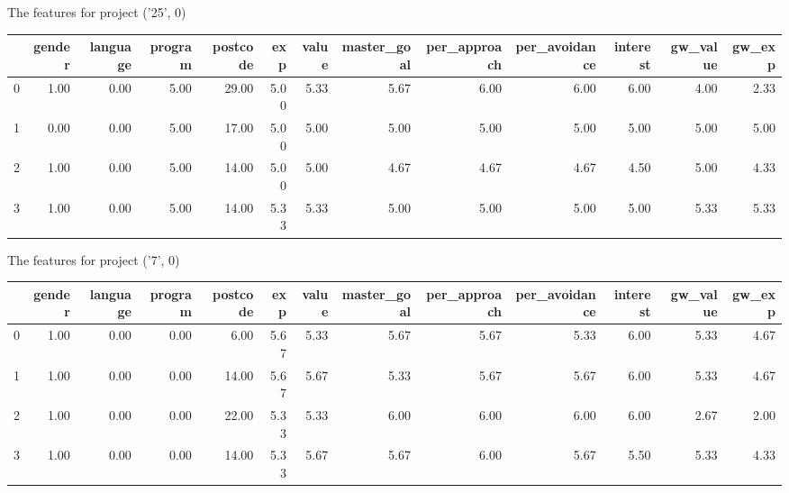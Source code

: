 \documentclass[7pt]{article}
\begin{document}
\begin{landscape}
The features for project ('25', 0)\newline
\begin{tabular}{lrrrrrrrrrrrr}
\toprule
{} &  gender &  language &  program &  postcode &  exp &  value &  master\_goal &  per\_approach &  per\_avoidance &  interest &  gw\_value &  gw\_exp \\
\midrule
0 &    1.00 &      0.00 &     5.00 &     29.00 & 5.00 &   5.33 &         5.67 &          6.00 &           6.00 &      6.00 &             4.00 &           2.33 \\
1 &    0.00 &      0.00 &     5.00 &     17.00 & 5.00 &   5.00 &         5.00 &          5.00 &           5.00 &      5.00 &             5.00 &           5.00 \\
2 &    1.00 &      0.00 &     5.00 &     14.00 & 5.00 &   5.00 &         4.67 &          4.67 &           4.67 &      4.50 &             5.00 &           4.33 \\
3 &    1.00 &      0.00 &     5.00 &     14.00 & 5.33 &   5.33 &         5.00 &          5.00 &           5.00 &      5.00 &             5.33 &           5.33 \\
\bottomrule
\end{tabular}

The features for project ('7', 0)\newline
\begin{tabular}{lrrrrrrrrrrrr}
\toprule
{} &  gender &  language &  program &  postcode &  exp &  value &  master\_goal &  per\_approach &  per\_avoidance &  interest &  gw\_value &  gw\_exp \\
\midrule
0 &    1.00 &      0.00 &     0.00 &      6.00 & 5.67 &   5.33 &         5.67 &          5.67 &           5.33 &      6.00 &             5.33 &           4.67 \\
1 &    1.00 &      0.00 &     0.00 &     14.00 & 5.67 &   5.67 &         5.33 &          5.67 &           5.67 &      6.00 &             5.33 &           4.67 \\
2 &    1.00 &      0.00 &     0.00 &     22.00 & 5.33 &   5.33 &         6.00 &          6.00 &           6.00 &      6.00 &             2.67 &           2.00 \\
3 &    1.00 &      0.00 &     0.00 &     14.00 & 5.33 &   5.67 &         5.67 &          6.00 &           5.67 &      5.50 &             5.33 &           4.33 \\
\bottomrule
\end{tabular}


\end{landscape}
\end{document}
